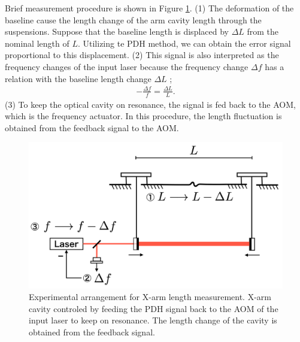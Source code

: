 Brief measurement procedure is shown in Figure \ref{img:img600}. (1) The deformation of the baseline cause the length change of the arm cavity length through the suspensions. Suppose that the baseline length is displaced by $\Delta{L}$ from the nominal length
of $L$. Utilizing te PDH method, we can obtain the error signal proportional to this displacement. (2) This signal is also interpreted as the frequency changes of the input laser because the frequency change $\Delta{f}$ has a relation with the baseline length change $\Delta{L}$ \cite{izumi2012multi};
\begin{eqnarray}
  \displaystyle -\frac{\Delta{f}}{f} = \frac{\Delta{L}}{L}.
\end{eqnarray}
(3) To keep the optical cavity on resonance, the signal is fed back to the AOM, which is the frequency actuator. In this procedure, the length fluctuation is obtained from the feedback signal to the AOM.
\begin{figure}[h]
  \centering
  \includegraphics[width=13cm]{./img_chap6/img600.png}
  \caption{Experimental arrangement for X-arm length measurement. X-arm cavity controled by feeding the PDH signal back to the AOM of the input laser to keep on resonance. The length change of the cavity is obtained from the feedback signal.}
  \label{img:img600}  
\end{figure}



